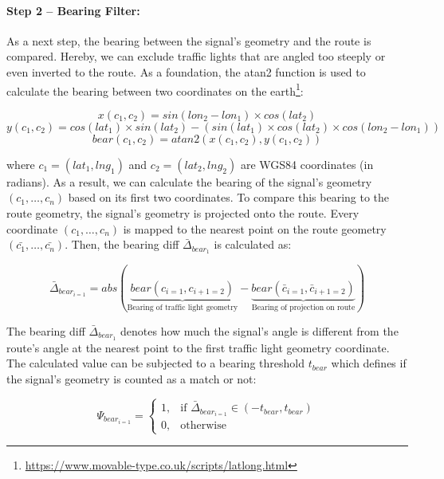 \paragraph{Step 2 -- Bearing Filter:} As a next step, the bearing between the signal's geometry and the route is compared. Hereby, we can exclude traffic lights that are angled too steeply or even inverted to the route. As a foundation, the atan2 function is used to calculate the bearing between two coordinates on the earth\footnote{\url{https://www.movable-type.co.uk/scripts/latlong.html}}:

\begin{equation}
x(c_1, c_2) = sin(lon_2 - lon_1) \times cos(lat_2)
\end{equation}
\begin{equation}
y(c_1, c_2) = cos(lat_1) \times sin(lat_2) - (sin(lat_1) \times cos(lat_2) \times cos(lon_2 - lon_1))
\end{equation}
\begin{equation}
bear(c_1, c_2) = atan2(x(c_1, c_2), y(c_1, c_2))
\end{equation}

where $c_1 = (lat_1, lng_1)$ and $c_2 = (lat_2, lng_2)$ are WGS84 coordinates (in radians). As a result, we can calculate the bearing of the signal's geometry $(c_1, \dots, c_n)$ based on its first two coordinates. To compare this bearing to the route geometry, the signal's geometry is projected onto the route. Every coordinate $(c_1, \dots, c_n)$ is mapped to the nearest point on the route geometry $(\bar{c_1}, \dots, \bar{c_n})$. Then, the bearing diff $\bar{\Delta}_{bear_1}$ is calculated as:

\begin{equation}
    \bar{\Delta}_{bear_{i=1}} = 
        abs(\underbrace{bear(c_{i=1}, c_{i+1=2})}_{\text{Bearing of traffic light geometry}} - \underbrace{bear(\bar{c}_{i=1}, \bar{c}_{i+1=2})}_{\text{Bearing of projection on route}})
\end{equation}

The bearing diff $\bar{\Delta}_{bear_1}$ denotes how much the signal's angle is different from the route's angle at the nearest point to the first traffic light geometry coordinate. The calculated value can be subjected to a bearing threshold $t_{bear}$ which defines if the signal's geometry is counted as a match or not:

\begin{equation}
\Psi_{bear_{i=1}} = 
    \begin{cases}
            1,& \text{if } \bar{\Delta}_{bear_{i=1}} \in \left(-t_{bear}, t_{bear}\right)\\
            0,              & \text{otherwise}
        \end{cases}
\end{equation}

